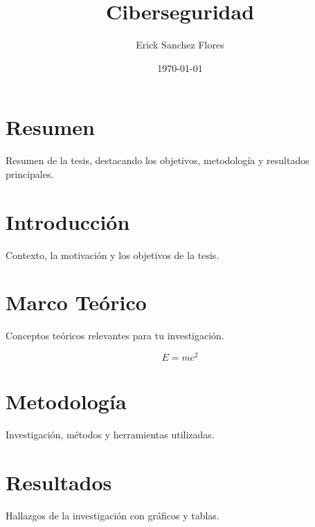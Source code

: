 \documentclass[12pt,letterpaper]{report}
\begin{document}
	
	\title {Ciberseguridad}
	\author{Erick Sanchez Flores}
	\date{\today}
	\maketitle
	
	\chapter*{Resumen}
	Resumen de la tesis, destacando los objetivos, metodología y resultados principales.
	
	\tableofcontents
	\listoffigures
	\listoftables
	
	\chapter{Introducción}
	Contexto, la motivación y los objetivos de la tesis.
	
	\chapter{Marco Teórico}
	Conceptos teóricos relevantes para tu investigación.
	
	\begin{equation}
		E=mc^2
	\end{equation}
	
	\chapter{Metodología}
	Investigación, métodos y herramientas utilizadas.
	
	\chapter{Resultados}
	Hallazgos de la investigación con gráficos y tablas.
	
\end{document}

